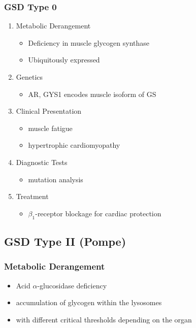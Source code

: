 \documentclass{scrartcl}
\begin{document}
\subsubsection{GSD Type 0}
\label{sec:orgda47abc}
\begin{enumerate}
\item Metabolic Derangement
\label{sec:orgadb1381}
\begin{itemize}
\item Deficiency in muscle glycogen synthase
\item Ubiquitously expressed
\end{itemize}

\item Genetics
\label{sec:orgec483bf}
\begin{itemize}
\item AR, GYS1 encodes muscle isoform of GS
\end{itemize}

\item Clinical Presentation
\label{sec:org2ae2c15}
\begin{itemize}
\item muscle fatigue
\item hypertrophic cardiomyopathy
\end{itemize}

\item Diagnostic Tests
\label{sec:org53a0fba}
\begin{itemize}
\item mutation analysis
\end{itemize}
\item Treatment
\label{sec:org88c489d}
\begin{itemize}
\item \(\beta_{\text{1}}\)-receptor blockage for cardiac protection
\end{itemize}
\end{enumerate}

\subsection{GSD Type II (Pompe)}
\label{sec:orgb2dc4fc}
\subsubsection{Metabolic Derangement}
\label{sec:org0a68254}
\begin{itemize}
\item Acid \(\alpha\)-glucosidase deficiency
\item accumulation of glycogen within the lysosomes
\item with different critical thresholds depending on the organ
\end{itemize}
\end{document}
